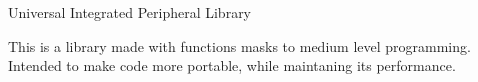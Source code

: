 Universal Integrated Peripheral Library

This is a library made with functions masks to medium level programming. Intended to make code more portable, while maintaning its performance. 